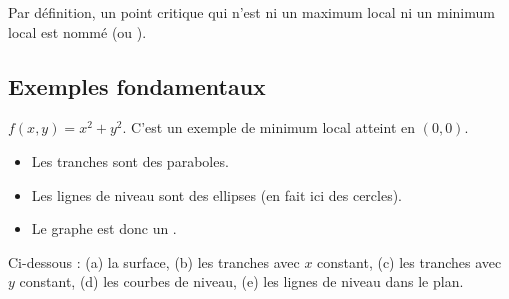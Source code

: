 \documentclass[11pt, class=report,crop=false]{standalone}
\begin{document}
Par définition, un point critique qui n'est ni un maximum local ni un minimum local est nommé  (ou ).

\subsection{Exemples fondamentaux}



\begin{exemple}
$f(x,y) = x^2 + y^2$. C'est un exemple de minimum local atteint en $(0,0)$.

\begin{itemize}
  \item Les tranches sont des paraboles.
  \item Les lignes de niveau sont des ellipses (en fait ici des cercles).
  \item Le graphe est donc un .
\end{itemize}

Ci-dessous : (a) la surface, (b) les tranches avec $x$ constant, (c) les tranches avec $y$ constant, (d) les courbes de niveau, (e) les lignes de niveau dans le plan.


\end{exemple}
\end{document}
